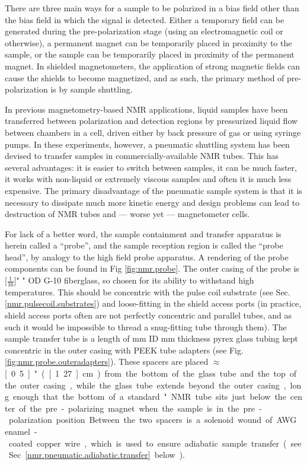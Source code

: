 \documentclass[PaulGanssle-Thesis.tex]{subfiles}
\begin{document}
There are three main ways for a sample to be polarized in a bias field other than the bias field in which the signal is detected. Either a temporary field can be generated during the pre-polarization stage (using an electromagnetic coil or otherwise), a permanent magnet can be temporarily placed in proximity to the sample, or the sample can be temporarily placed in proximity of the permanent magnet. In shielded magnetometers, the application of strong magnetic fields can cause the shields to become magnetized, and as such, the primary method of pre-polarization is by sample shuttling.

In previous magnetometry-based NMR applications, liquid samples have been transferred between polarization and detection regions by pressurized liquid flow between chambers in a cell, driven either by back pressure of gas or using syringe pumps. In these experiments, however, a pneumatic shuttling system has been devised to transfer samples in commercially-available NMR tubes. This has several advantages: it is easier to switch between samples, it can be much faster, it works with non-liquid or extremely viscous samples and often it is much less expensive. The primary disadvantage of the pneumatic sample system is that it is necessary to dissipate much more kinetic energy and design problems can lead to destruction of NMR tubes and --- worse yet --- magnetometer cells. 

For lack of a better word, the sample containment and transfer apparatus is herein called a ``probe'', and the sample reception region is called the ``probe head'', by analogy to the high field probe apparatus. A rendering of the probe components can be found in Fig \ref{fig:nmr.probe}. The outer casing of the probe is \unit[$\frac{1}{16}$]{"} \unit[1]{"} OD G-10 fiberglass, so chosen for its ability to withstand high temperatures. This should be concentric with the pulse coil substrate (see Sec. \ref{nmr.pulsecoil.substrates}) and loose-fitting in the shield access ports (in practice, shield access ports often are not perfectly concentric and parallel tubes, and as such it would be impossible to thread a snug-fitting tube through them). The sample transfer tube is a length of \unit[9]{mm} ID \unit[1]{mm} thickness pyrex glass tubing kept concentric in the outer casing with PEEK tube adapters (see Fig. \ref{fig:nmr.probe.outeradapters}). These spacers are placed $\approx$ \unit[0.5]{"} (\unit[1.27]{cm}) from the bottom of the glass tube and the top of the outer casing, while the glass tube extends beyond the outer casing, long enough that the bottom of a standard \unit[7]{"} NMR tube sits just below the center of the pre-polarizing magnet when the sample is in the pre-polarization position. Between the two spacers is a solenoid wound of \unit[30]{AWG} enamel-coated copper wire, which is used to ensure adiabatic sample transfer (see Sec. \ref{nmr.pneumatic.adiabatic.transfer} below). 
\end{document}
